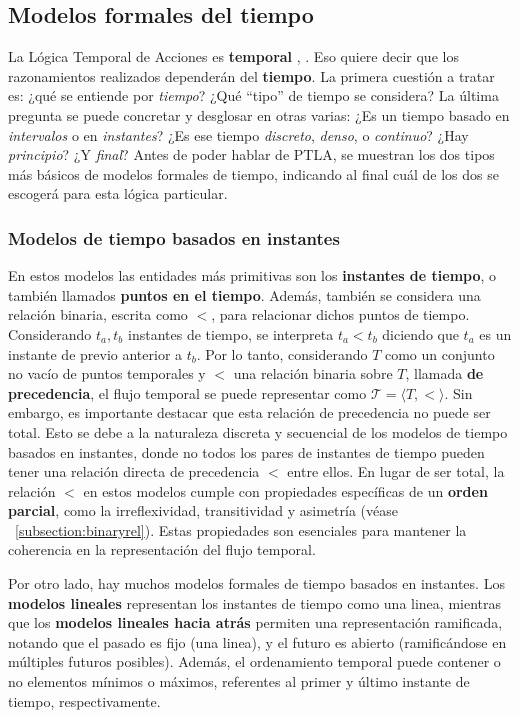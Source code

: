 \subsection{Modelos formales del tiempo}\label{subsection:TLAtime}
La Lógica Temporal de Acciones es \textbf{temporal} \cite{Pnueli1977TheTL}, \cite{gorankoRumberg2020temporal}. Eso quiere decir que los razonamientos realizados dependerán del \textbf{tiempo}. La primera cuestión a tratar es: ¿qué se entiende por \textit{tiempo}? ¿Qué ``tipo'' de tiempo se considera? La última pregunta se puede concretar y desglosar en otras varias: ¿Es un tiempo basado en \textit{intervalos} o en \textit{instantes}? ¿Es ese tiempo \textit{discreto}, \textit{denso}, o \textit{continuo}? ¿Hay \textit{principio}? ¿Y \textit{final}? Antes de poder hablar de PTLA, se muestran los dos tipos más básicos de modelos formales de tiempo, indicando al final cuál de los dos se escogerá para esta lógica particular.

\subsubsection{Modelos de tiempo basados en instantes}\label{subsubsection:TLAtimeinstant}
En estos modelos las entidades más primitivas son los \textbf{instantes de tiempo}, o también llamados \textbf{puntos en el tiempo}. Además, también se considera una relación binaria, escrita como $<$, para relacionar dichos puntos de tiempo. Considerando $t_a,t_b$  instantes de tiempo, se interpreta $t_a < t_b$ diciendo que $t_a$ es un instante de previo anterior a $t_b$. Por lo tanto, considerando $T$ como un conjunto no vacío de puntos temporales y $<$ una relación binaria sobre $T$, llamada \textbf{de precedencia}, el flujo temporal se puede representar como $\mathcal{T} = \langle T, <\rangle$. Sin embargo, es importante destacar que esta relación de precedencia no puede ser total. Esto se debe a la naturaleza discreta y secuencial de los modelos de tiempo basados en instantes, donde no todos los pares de instantes de tiempo pueden tener una relación directa de precedencia $<$ entre ellos. En lugar de ser total, la relación $<$ en estos modelos cumple con propiedades específicas de un \textbf{orden parcial}, como la irreflexividad, transitividad y asimetría (véase ~\ref{subsection:binaryrel}). Estas propiedades son esenciales para mantener la coherencia en la representación del flujo temporal.

Por otro lado, hay muchos modelos formales de tiempo basados en instantes. Los \textbf{modelos lineales} representan los instantes de tiempo como una linea, mientras que los \textbf{modelos lineales hacia atrás} permiten una representación ramificada, notando que el pasado es fijo (una linea), y el futuro es abierto (ramificándose en múltiples futuros posibles). Además, el ordenamiento temporal puede contener o no elementos mínimos o máximos, referentes al primer y último instante de tiempo, respectivamente.

